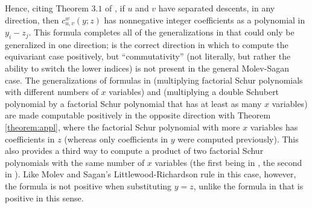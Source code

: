 \documentclass{amsart}
\theoremstyle{definition}
\theoremstyle{remark}
\numberwithin{equation}{subsection}
\begin{document}
Hence, citing Theorem $3.1$ of \cite{samuelmolev}, if $u$ and $v$ have separated descents, in any direction, then $c_{u,v}^w(y;z)$ has nonnegative integer coefficients as a polynomial in $y_i-z_j$.
%
This formula completes all of the generalizations in \cite{samuelmolev} that could only be generalized in one direction; \cite{samuelmolev} is the correct direction in which to compute the equivariant case positively, but ``commutativity'' (not literally, but rather the ability to switch the lower indices) is not present in the general Molev-Sagan case. The generalizations of formulas in \cite{grass} (multiplying factorial Schur polynomials with different numbers of $x$ variables) and \cite{kohnert1997multiplication} (multiplying a double Schubert polynomial by a factorial Schur polynomial that has at least as many $x$ variables) are made computable positively in the opposite direction with Theorem \ref{theorem:appl}, where the factorial Schur polynomial with more $x$ variables has coefficients in $z$ (whereas only coefficients in $y$ were computed previously). This also provides a third way to compute a product of two factorial Schur polynomials with the same number of $x$ variables (the first being in \cite{molev1999littlewood}, the second in \cite{samuelmolev}). Like Molev and Sagan's Littlewood-Richardson rule in this case, however, the formula is not positive when substituting $y=z$, unlike the formula in \cite{samuelmolev} that is positive in this sense.
%
\end{document}
